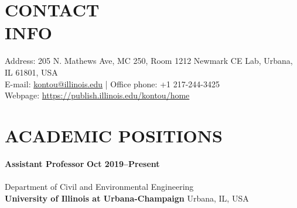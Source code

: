 \documentclass[margin,line]{resume}
\begin{document}
\begin{resume}
    \section{\mysidestyle \bf CONTACT\\INFO}
		   Address: 205 N. Mathews Ave, MC 250, Room 1212 Newmark CE Lab, Urbana, IL 61801, USA  \vspace{0mm}\\\vspace{0mm}%
                       E-mail: \href{mailto:kontou@illinois.edu}{kontou@illinois.edu}  | Office phone: +1 217-244-3425     \vspace{0mm}\\\vspace{0mm}%
    Webpage: \url{https://publish.illinois.edu/kontou/home}  \vspace{0mm}\\\vspace{-1mm}%
    

%
 	  \vspace{-0.2in}
    \section{\mysidestyle \bf ACADEMIC POSITIONS}
     \textbf{Assistant Professor}  \hfill \textbf{Oct 2019--Present}\vspace{-3mm}\\\vspace{-1mm}%
    \\  Department of Civil and Environmental Engineering
    \\ \textbf{University of Illinois at Urbana-Champaign} Urbana, IL, USA \\
    
    

\end{resume}
\end{document}
